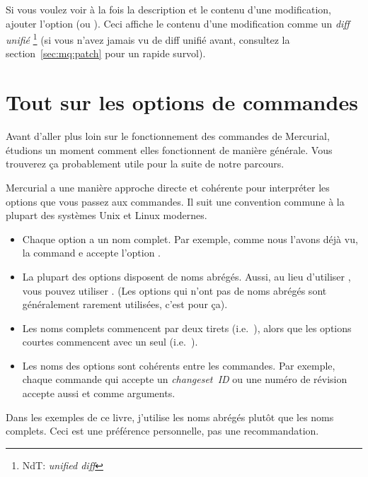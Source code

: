 Si vous voulez voir à la fois la description et le contenu d'une 
modification, ajouter l'option  (ou ).
Ceci affiche le contenu d'une modification comme un \emph{diff unifié}
\footnote{NdT: \textit{unified diff}} (si vous n'avez jamais vu de diff 
unifié avant, consultez la section~\ref{sec:mq:patch} pour un rapide 
survol).


\section{Tout sur les options de commandes}


Avant d'aller plus loin sur le fonctionnement des commandes de Mercurial,
étudions un moment comment elles fonctionnent de manière générale. Vous
trouverez ça probablement utile pour la suite de notre parcours.

Mercurial a une manière approche directe et cohérente pour interpréter %
les options que vous passez aux commandes. Il suit une convention commune
à la plupart des systèmes Unix et Linux modernes.

\begin{itemize}
\item Chaque option a un nom complet. Par exemple, comme nous l'avons déjà
      vu, la command e accepte l'option .%
\item La plupart des options disposent de noms abrégés. Aussi, au lieu d'utiliser
  , vous pouvez utiliser . (Les options qui
  n'ont pas de noms abrégés sont généralement rarement utilisées, c'est pour ça).
\item Les noms complets commencent par deux tirets (i.e.~),
  alors que les options courtes commencent avec un seul (i.e.~).
\item Les noms des options sont cohérents entre les commandes. Par exemple, 
  chaque commande qui accepte un \textit{changeset~ID} ou une numéro de révision
  accepte aussi  et  comme arguments.
\end{itemize}

Dans les exemples de ce livre, j'utilise les noms abrégés plutôt que les noms
complets. Ceci est une préférence personnelle, pas une recommandation.

